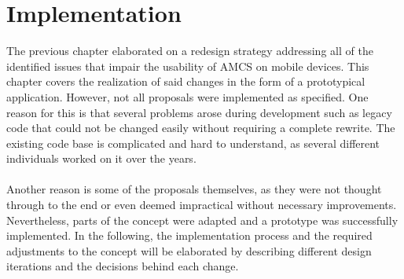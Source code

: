 \chapter{Implementation}
\label{chapter:implementation}

The previous chapter elaborated on a redesign strategy addressing all of the identified issues that impair the usability of AMCS on mobile devices.
This chapter covers the realization of said changes in the form of a prototypical application. However, not all proposals were implemented as specified. One reason for this is that several problems arose during development such as legacy code that could not be changed easily without requiring a complete rewrite. The existing code base is complicated and hard to understand, as several different individuals worked on it over the years.
\\
\\ 
Another reason is some of the proposals themselves, as they were not thought through to the end or even deemed impractical without necessary improvements. Nevertheless, parts of the concept were adapted and a prototype was successfully implemented.
In the following, the implementation process and the required adjustments to the concept will be elaborated by describing different design iterations and the decisions behind each change.

